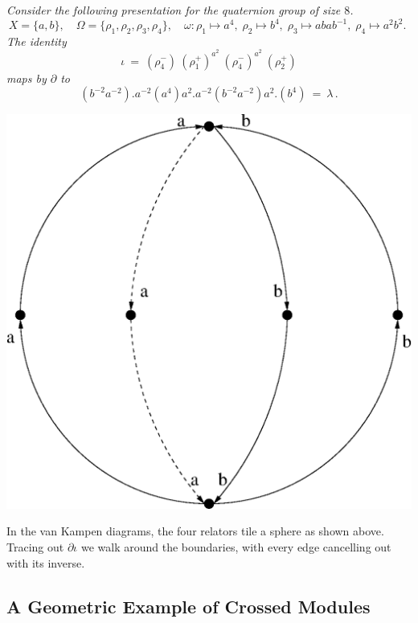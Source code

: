 \newpage
\begin{example}
\emph{Consider the following presentation for the quaternion group 
of size $8$.}
$$
X = \{a,b\}, \quad
\Omega = \{\rho_1,\rho_2,\rho_3,\rho_4\}, \quad
\omega : \rho_1 \mapsto a^4,\; \rho_2 \mapsto b^4,\; 
\rho_3 \mapsto abab^{-1},\; \rho_4 \mapsto a^2b^2.\; 
$$
\emph{The identity}
$$
\iota ~=~ (\rho_4^-)\ (\rho_1^+)^{a^2}\ (\rho_4^-)^{a^2}\ (\rho_2^+)
$$
\emph{maps by $\partial$ to}
$$
(b^{-2}a^{-2}).a^{-2}(a^4)a^2.a^{-2}(b^{-2}a^{-2})a^2.(b^4) ~=~ \lambda\,.
$$
\end{example}

\bigskip
\begin{center}
\includegraphics[scale = 0.75]{xmodcat1/q8-vankampen.eps}
\end{center}

In the van Kampen diagrams, the four relators tile a sphere as shown above. 
Tracing out $\partial \iota$ we walk around the boundaries, 
with every edge cancelling out with its inverse. 


\newpage
\subsection{A Geometric Example of Crossed Modules} \label{subs:geom-ex}

